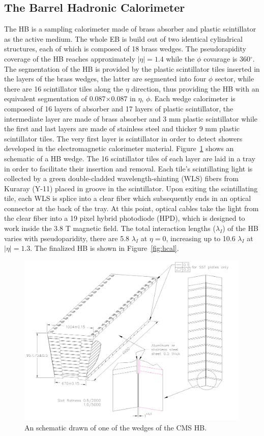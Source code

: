 \subsection{The Barrel Hadronic Calorimeter}
The HB is a sampling calorimeter made of brass absorber and plastic
scintillator as the active medium. The whole EB is build out of two
identical cylindrical structures, each of which is composed of 18
brass wedges. The pseudorapidity coverage of the HB reaches
approximately $|\eta| = 1.4$ while the $\phi$ covarage is
360$^{\circ}$. The segmentation of the HB is provided by the plastic
scintillator tiles inserted in the layers of the brass wedges, the latter
are segmented into four $\phi$ sector, while there are 16 scintillator
tiles along the $\eta$ direction, thus providing the HB with an
equivalent segmentation of 0.087$\times$0.087 in $\eta$, $\phi$. Each
wedge calorimeter is composed of 16 layers of absorber and 17 layers of
plastic scintillator, the intermediate layer are made of brass
absorber and 3 mm plastic scintillator while the first and last layers
are made of stainless steel  and thicker 9 mm plastic scintillator
tiles. The very first layer is scintillator in order to detect showers
developed in the electromagnetic calorimeter
material. Figure~\ref{fig:HCALwedge} shows an schematic of a HB
wedge. The 16 scintillator tiles of each layer are laid in a tray in
order to facilitate their insertion and removal. Each tile's
scintillating light is collected by a green double-cladded
wavelength-shinting (WLS) fibers from Kuraray (Y-11) placed in groove
in the scintillator. Upon exiting the scintillating tile, each WLS is
splice into a clear fiber which subsequently ends in an optical
connector at the back of the tray. At this point, optical cables
take the light from the clear fiber into a 19 pixel hybrid photodiode
(HPD), which is designed to work inside the 3.8 T magnetic field. The
total interaction lengths ($\lambda_{I}$) of the HB varies with
pseudoparidity, there are 5.8 $\lambda_{I}$ at $\eta = 0$, increasing
up to 10.6 $\lambda_{I}$ at $|\eta| = 1.3$.
The finalized HB is shown in Figure~\ref{fig:hcal}.
\begin{figure}
 \centering
\includegraphics[width=0.99\textwidth]{CMS_DetectorFigures/HCAL_Wedge.pdf}
\caption{An schematic drawn of one of the wedges of the CMS HB.\label{fig:HCALwedge}}
\end{figure}
